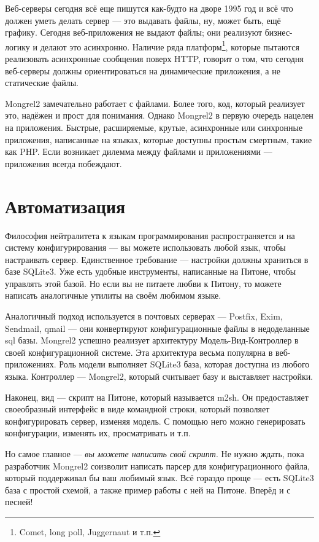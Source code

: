 Веб-серверы сегодня всё еще пишутся как-будто на дворе 1995 год и всё что должен уметь
делать сервер --- это выдавать файлы, ну, может быть, ещё графику. Сегодня веб-приложения
не выдают файлы; они реализуют бизнес-логику и делают это асинхронно. Наличие ряда
платформ\footnote{Comet, long poll, Juggernaut и т.п.}, которые пытаются реализовать
асинхронные сообщения поверх HTTP, говорит о том,
что сегодня веб-серверы должны ориентироваться на динамические приложения, а не
статические файлы.

Mongrel2 замечательно работает с файлами. Более того, код, который реализует это,
надёжен и прост для понимания. Однако Mongrel2 в первую очередь нацелен на приложения.
Быстрые, расширяемые, крутые, асинхронные или синхронные приложения, написанные на
языках, которые доступны простым смертным, такие как PHP. Если возникает дилемма
между файлами и приложениями --- приложения всегда побеждают.

\section{Автоматизация}

Философия нейтралитета к языкам программирования распространяется и на систему
конфигурирования --- вы можете использовать любой язык, чтобы настраивать сервер.
Единственное требование --- настройки должны храниться в базе SQLite3. Уже есть
удобные инструменты, написанные на Питоне, чтобы управлять этой базой. Но если
вы не питаете любви к Питону, то можете написать аналогичные утилиты на своём
любимом языке.

Аналогичный подход используется в почтовых серверах --- Postfix, Exim, Sendmail, qmail ---
они конвертируют конфигурационные файлы в недоделанные sql базы.
Mongrel2 успешно реализует архитектуру Модель-Вид-Контроллер в своей конфигурационной
системе. Эта архитектура весьма популярна в веб-приложениях. Роль модели выполняет
SQLite3 база, которая доступна из любого языка. Контроллер --- Mongrel2,
который считывает базу и выставляет настройки.

Наконец, вид --- скрипт на Питоне, который называется m2sh. Он предоставляет
своеобразный интерфейс в виде командной строки, который позволяет конфигурировать
сервер, изменяя модель. С помощью него можно генерировать конфигурации, изменять
их, просматривать и т.п.

Но самое главное --- \emph{вы можете написать свой скрипт}. Не нужно ждать, пока
разработчик Mongrel2 соизволит написать парсер для конфигурационного файла,
который поддерживал бы ваш любимый язык. Всё гораздо проще --- есть SQLite3 база
с простой схемой, а также пример работы с ней на Питоне. Вперёд и с песней!

